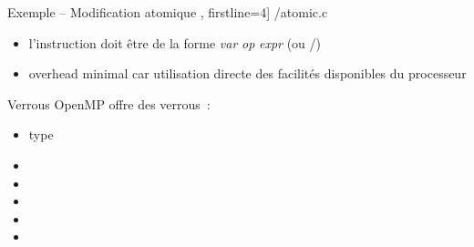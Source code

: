 
\begin {frame} [fragile] {Exemple \theompexemple{} -- Modification atomique}
    \scriptsize\lstmonstyle, firstline=4] {\inc/atomic.c}

    \begin {itemize}
	\item l'instruction doit être de la forme \emph {var} \emph
	    {op}\code {=} \emph {expr} (ou \code {++}/\code {-{}-})

	\item overhead minimal car utilisation directe des facilités
	    disponibles du processeur

    \end {itemize}
\end{frame}


\begin {frame} {Verrous}
    OpenMP offre des verrous~:

    \begin {itemize}
	\item type 
	\item {}
	\item {}
	\item {}
	\item {}
	\item {}

    \end {itemize}
\end {frame}

